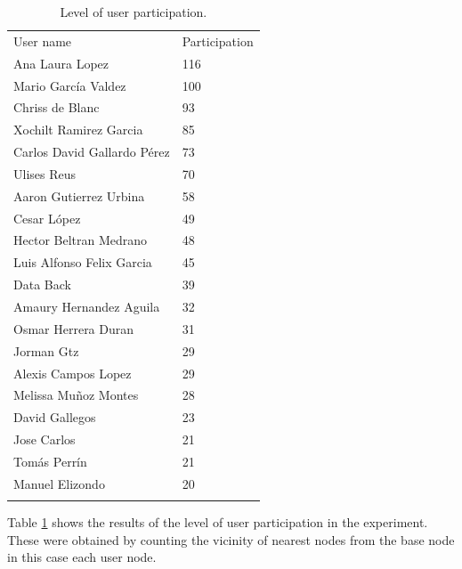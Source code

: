 \begin{table}
\small
\caption{Level of user participation.}
\label{tab:userParticipation_1}
\centering
\small
\begin{tabular}{p{4cm} p{4cm}}
\hline\noalign{\smallskip}
 User name & Participation   \\
\noalign{\smallskip}\hline\noalign{\smallskip}
\small{Ana Laura Lopez} & \small{116} \\ \hline
\small{Mario García Valdez} & \small{100} \\ \hline
\small{Chriss de Blanc} & \small{93} \\ \hline
\small{Xochilt Ramirez Garcia} & \small{85} \\ \hline
\small{Carlos David Gallardo Pérez} & \small{73} \\ \hline
\small{Ulises Reus} & \small{70} \\ \hline
\small{Aaron Gutierrez Urbina} & \small{58} \\ \hline
\small{Cesar López} & \small{49} \\ \hline
\small{Hector Beltran Medrano} & \small{48} \\ \hline
\small{Luis Alfonso Felix Garcia} & \small{45} \\ \hline
\small{Data Back} & \small{39} \\ \hline
\small{Amaury Hernandez Aguila} & \small{32} \\ \hline
\small{Osmar Herrera Duran} & \small{31} \\ \hline
\small{Jorman Gtz} & \small{29} \\ \hline
\small{Alexis Campos Lopez} & \small{29} \\ \hline
\small{Melissa Muñoz Montes} & \small{28} \\ \hline
\small{David Gallegos} & \small{23} \\ \hline
\small{Jose Carlos} & \small{21} \\ \hline
\small{Tomás Perrín} & \small{21} \\ \hline
\small{Manuel Elizondo} & \small{20} \\ \hline


\noalign{\smallskip}\hline
\end{tabular}
\end{table}




Table \ref{tab:userParticipation_1} shows the results of the level of user
participation in the experiment. These were obtained by counting the vicinity of
nearest nodes from the base node in this case each user node.



